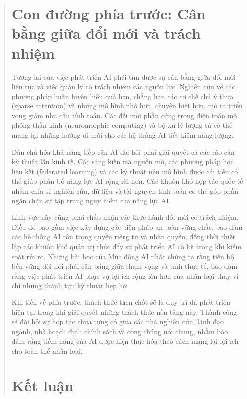 \begin{quote}
\section{Con đường phía trước: Cân bằng giữa đổi mới và trách nhiệm}

Tương lai của việc phát triển AI phải tìm được sự cân bằng giữa đổi mới liên tục và việc quản lý có trách nhiệm các nguồn lực. Nghiên cứu về các phương pháp huấn luyện hiệu quả hơn, chẳng hạn các cơ chế chú ý thưa (sparse attention) và những mô hình nhỏ hơn, chuyên biệt hơn, mở ra triển vọng giảm nhu cầu tính toán. Các đổi mới phần cứng trong điện toán mô phỏng thần kinh (neuromorphic computing) và bộ xử lý lượng tử có thể mang lại những hướng đi mới cho các hệ thống AI tiết kiệm năng lượng.

Dân chủ hóa khả năng tiếp cận AI đòi hỏi phải giải quyết cả các rào cản kỹ thuật lẫn kinh tế. Các sáng kiến mã nguồn mở, các phương pháp học liên kết (federated learning) và các kỹ thuật nén mô hình được cải tiến có thể giúp phân bổ năng lực AI rộng rãi hơn. Các khuôn khổ hợp tác quốc tế nhằm chia sẻ nghiên cứu, dữ liệu và tài nguyên tính toán có thể góp phần ngăn chặn sự tập trung nguy hiểm của năng lực AI.

Lĩnh vực này cũng phải chấp nhận các thực hành đổi mới có trách nhiệm. Điều đó bao gồm việc xây dựng các biện pháp an toàn vững chắc, bảo đảm các hệ thống AI tôn trọng quyền riêng tư và nhân quyền, đồng thời thiết lập các khuôn khổ quản trị thúc đẩy sự phát triển AI có lợi trong khi kiểm soát rủi ro. Những bài học của Mùa đông AI nhắc chúng ta rằng tiến bộ bền vững đòi hỏi phải cân bằng giữa tham vọng và tính thực tế, bảo đảm rằng việc phát triển AI phục vụ lợi ích rộng lớn hơn của nhân loại thay vì chỉ những thành tựu kỹ thuật hẹp hòi.

Khi tiến về phía trước, thách thức then chốt sẽ là duy trì đà phát triển hiện tại trong khi giải quyết những thách thức nền tảng này. Thành công sẽ đòi hỏi sự hợp tác chưa từng có giữa các nhà nghiên cứu, lãnh đạo ngành, nhà hoạch định chính sách và công chúng nói chung, nhằm bảo đảm rằng tiềm năng của AI được hiện thực hóa theo cách mang lại lợi ích cho toàn thể nhân loại.

\section{Kết luận}


\end{quote}
